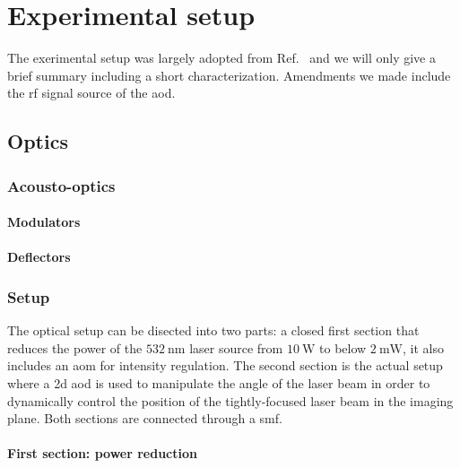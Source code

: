 \chapter{Experimental setup}\label{ch:experimental_setup}

The exerimental setup was largely adopted from Ref.~\cite{Hertlein2017} and we
will only give a brief summary including a short characterization. Amendments
we made include the \gls{rf} signal source of the \gls{aod}.

\section{Optics}

\subsection{Acousto-optics}

\subsubsection{Modulators}

\subsubsection{Deflectors}

\subsection{Setup}

The optical setup can be disected into two parts: a closed first section that
reduces the power of the $\SI{532}{\nano\meter}$ laser source from
$\SI{10}{\watt}$ to below $\SI{2}{\milli\watt}$, it also includes an \gls{aom}
for intensity regulation. The second section is the actual setup where a
\gls{2d} \gls{aod} is used to manipulate the angle of the laser beam in order
to dynamically control the position of the tightly-focused laser beam in the
imaging plane. Both sections are connected through a \gls{smf}.

\subsubsection{First section: power reduction}\label{subsec:setup_power_reduction}

